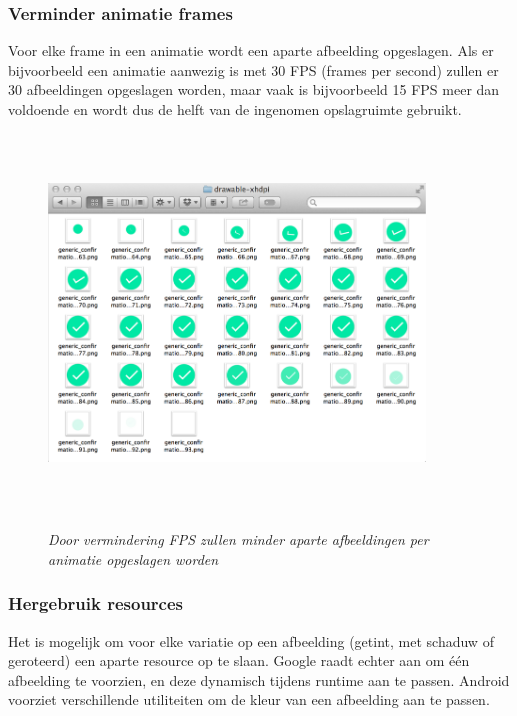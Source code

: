 \subsubsection{Verminder animatie frames }
\label{sec:reduceanimationframes}
Voor elke frame in een animatie wordt een aparte afbeelding opgeslagen. Als er bijvoorbeeld een animatie aanwezig is met 30 FPS (frames per second) zullen er 30 afbeeldingen opgeslagen worden, maar vaak is bijvoorbeeld 15 FPS meer dan voldoende en wordt dus de helft van de ingenomen opslagruimte gebruikt.
\begin{figure}[H]
	\centering
	\caption{\textit{Door vermindering FPS zullen minder aparte afbeeldingen per animatie opgeslagen worden}\newline}
	\includegraphics[width=10cm, height=10cm, keepaspectratio]{img/animation-frames}\\[.5cm]
	
\end{figure}
\subsubsection{Hergebruik resources }
\label{sec:reuseresources}
Het is mogelijk om voor elke variatie op een afbeelding (getint, met schaduw of geroteerd) een aparte resource op te slaan. Google raadt echter aan om één afbeelding te voorzien, en deze dynamisch tijdens runtime aan te passen. 
Android voorziet verschillende utiliteiten om de kleur van een afbeelding aan te passen.
